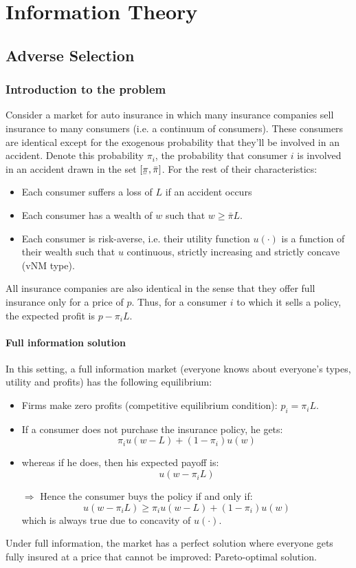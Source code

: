 \documentclass[12pt]{report}
\newcommand{\ubar}[1]{\underaccent{\bar}{#1}}
\begin{document}
\chapter{Information Theory}

\section{Adverse Selection}

\subsection{Introduction to the problem}

Consider a market for auto insurance in which many insurance companies sell insurance to many consumers (i.e. a continuum of consumers). These consumers are identical except for the exogenous probability that they'll be involved in an accident. Denote this probability $\pi_i$, the probability that consumer $i$ is involved in an accident drawn in the set $[\ubar\pi, \bar\pi]$. For the rest of their characteristics:\begin{itemize}
\item Each consumer suffers a loss of $L$ if an accident occurs
\item Each consumer has a wealth of $w$ such that $w\geq \bar\pi L$.
\item Each consumer is risk-averse, i.e. their utility function $u(\cdot)$ is a function of their wealth such that $u$ continuous, strictly increasing and strictly concave (vNM type).
\end{itemize}
All insurance companies are also identical in the sense that they offer full insurance only for a price of $p$. Thus, for a consumer $i$ to which it sells a policy, the expected profit is $p - \pi_i L$.

\subsubsection{Full information solution}

In this setting, a full information market (everyone knows about everyone's types, utility and profits) has the following equilibrium:
\begin{itemize}
\item Firms make zero profits (competitive equilibrium condition): $p_i = \pi_i L$.
\item If a consumer does not purchase the insurance policy, he gets: $$\pi_i u(w - L) + (1-\pi_i) u(w)$$
\item whereas if he does, then his expected payoff is: $$u(w - \pi_i L) $$
\item[$\Rightarrow$] Hence the consumer buys the policy if and only if: $$u(w - \pi_i L)\geq \pi_i u(w - L) + (1-\pi_i) u(w) $$ which is always true due to concavity of $u(\cdot)$.
\end{itemize}
Under full information, the market has a perfect solution where everyone gets fully insured at a price that cannot be improved: Pareto-optimal solution.
\end{document}
